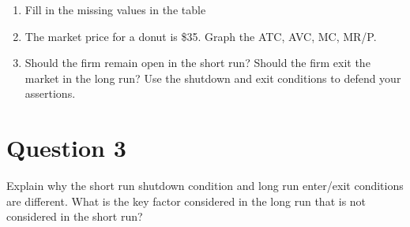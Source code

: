\documentclass[12pt]{article}
\begin{document}
\begin{enumerate}[label = (\alph*)]
    \item Fill in the missing values in the table
    \item The market price for a donut is \$35. Graph the ATC, AVC, MC, MR/P.
    \item  Should the firm remain open in the short run? Should the firm exit the market in the long run? Use the shutdown and exit conditions to defend your assertions.
\end{enumerate}


\section*{Question 3}
Explain why the short run shutdown condition and long run enter/exit conditions are different. What is the key factor considered in the long run that is not considered in the short run?
\end{document}
